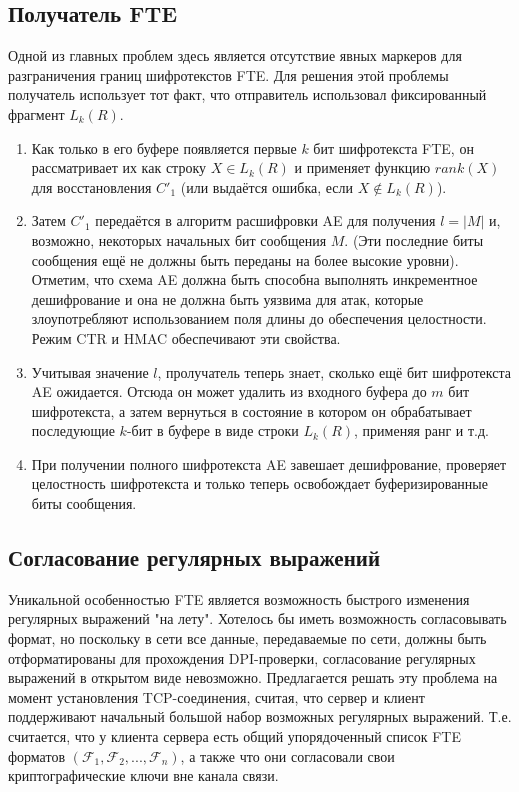 \subsection{Получатель FTE}

Одной из главных проблем здесь является отсутствие явных маркеров для разграничения границ шифротекстов FTE.
Для решения этой проблемы получатель использует тот факт, что отправитель использовал фиксированный фрагмент $L_k(R)$.

\begin{enumerate}
    \item Как только в его буфере появляется первые $k$ бит шифротекста FTE,
          он рассматривает их как строку $X \in L_k(R)$ и применяет функцию $rank(X)$ для восстановления $C'_1$ (или выдаётся ошибка, если $X \notin L_k(R)$).
    \item Затем $C'_1$ передаётся в алгоритм расшифровки AE для получения $l = |M|$ и, возможно, некоторых начальных бит сообщения $M$.
          (Эти последние биты сообщения ещё не должны быть переданы на более высокие уровни).
          Отметим, что схема AE должна быть способна выполнять инкрементное дешифрование и она не должна быть уязвима для атак,
          которые злоупотребляют использованием поля длины до обеспечения целостности. Режим CTR и HMAC обеспечивают эти свойства.
    \item Учитывая значение $l$, пролучатель теперь знает, сколько ещё бит шифротекста AE ожидается.
          Отсюда он может удалить из входного буфера до $m$ бит шифротекста,
          а затем вернуться в состояние в котором он обрабатывает последующие $k$-бит в буфере в виде строки $L_k(R)$, применяя ранг и т.д.
    \item При получении полного шифротекста AE завешает дешифрование, проверяет целостность шифротекста
          и только теперь освобождает буферизированные биты сообщения.
\end{enumerate}

\subsection{Согласование регулярных выражений}

Уникальной особенностью FTE является возможность быстрого изменения регулярных выражений "на лету".
Хотелось бы иметь возможность согласовывать формат, но поскольку в сети все данные, передаваемые по сети,
должны быть отформатированы для прохождения DPI-проверки, согласование регулярных выражений в открытом виде невозможно.
Предлагается решать эту проблема на момент установления TCP-соединения, считая,
что сервер и клиент поддерживают начальный большой набор возможных регулярных выражений.
Т.е. считается, что у клиента сервера есть общий упорядоченный список FTE форматов $(\mathcal{F}_1, \mathcal{F}_2, ..., \mathcal{F}_n)$,
а также что они согласовали свои криптографические ключи вне канала связи.

